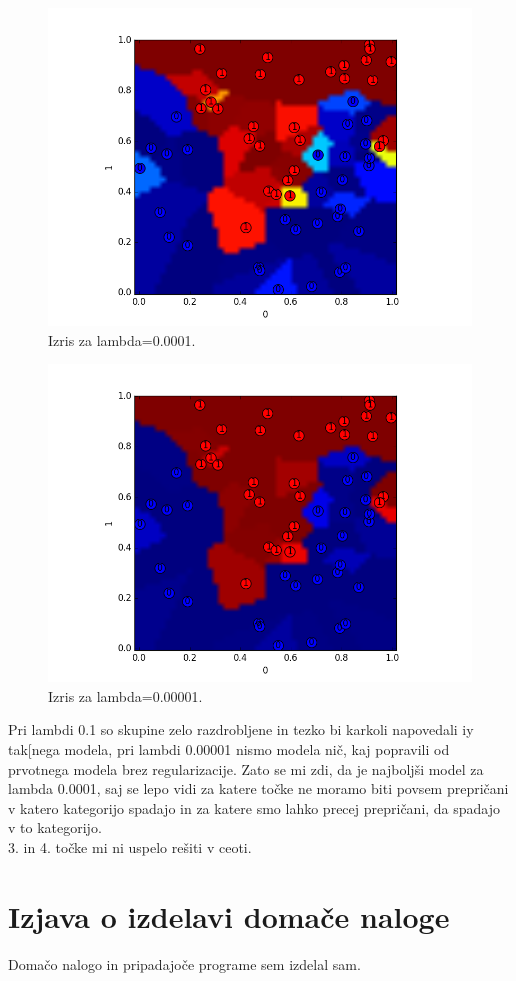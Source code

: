 \documentclass[a4paper,11pt]{article}
\begin{document}
\begin{figure}[htbp]
\begin{center}
\includegraphics[scale=0.6]{lambda0001.png}
\caption{Izris za lambda=0.0001.}
\label{slika1}
\end{center}
\end{figure}

\begin{figure}[htbp]
\begin{center}
\includegraphics[scale=0.6]{lambda00001.png}
\caption{Izris za lambda=0.00001.}
\label{slika1}
\end{center}
\end{figure}

Pri lambdi 0.1 so skupine zelo razdrobljene in tezko bi karkoli napovedali iy tak[nega modela, pri lambdi 0.00001 nismo modela nič, kaj popravili od prvotnega modela brez regularizacije. Zato se mi zdi, da je najboljši model za lambda 0.0001, saj se lepo vidi za katere točke ne moramo biti povsem prepričani v katero kategorijo spadajo in za katere smo lahko precej prepričani, da spadajo v to kategorijo.\\
3. in 4. točke mi ni uspelo rešiti v ceoti.

\section{Izjava o izdelavi domače naloge}
Domačo nalogo in pripadajoče programe sem izdelal sam.
\end{document}
